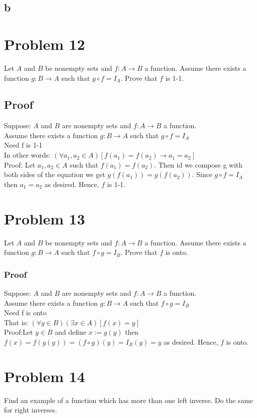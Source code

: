 \documentclass{article}
\begin{document}
\subsection*{b}
\section*{Problem 12}
Let $A$ and $B$ be nonempty sets and $f: A \rightarrow B$ a function. Assume there exists a function $g:B \rightarrow A$ such that $g \circ f = I_A$. Prove that $f$ is 1-1.
\subsection*{Proof}
Suppose: $A$ and $B$ are nonempty sets and $f: A \rightarrow B$ a function. \\
Assume there exists a function $g:B \rightarrow A$  such that $g \circ f = I_A$\\
Need f is 1-1\\
In other words: $(\forall a_1, a_2 \in A)[f(a_1) = f(a_2) \rightarrow a_1 = a_2]$ \\
Proof: Let $a_1, a_2 \in A$ such that $f(a_1) = f(a_2)$. Then id we compose g with both sides of the equation we get $g(f(a_1)) = g(f(a_2))$. Since $g \circ f = I_A$ then $a_1 = a_2$ as desired. Hence, $f$ is 1-1.
\section*{Problem 13}
Let $A$ and $B$ be nonempty sets and $f: A \rightarrow B$ a function. Assume there exists a function $g:B \rightarrow A$ such that $f \circ g = I_B$. Prove that $f$ is onto.
\subsubsection*{Proof}
Suppose: $A$ and $B$ are nonempty sets and $f: A \rightarrow B$ a function. \\
Assume there exists a function $g:B \rightarrow A$  such that $f \circ g = I_B$\\
Need f is onto\\
That is: $(\forall y \in B)(\exists x \in A)[f(x) = y]$ \\
Proof:Let $y \in B$ and define $x := g(y)$ then $f(x) = f(g(y)) = (f \circ g)(y) = I_B(y) = y$ as desired. Hence, $f$ is onto.
\section*{Problem 14}
Find an example of a function which has more than one left inverse. Do the same for right inverses.
\end{document}
